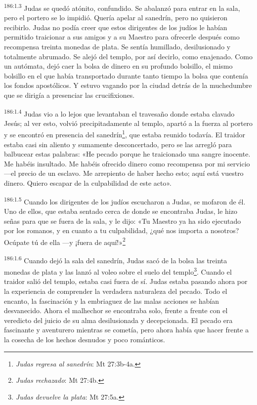 \par
\textsuperscript{186:1.3} Judas se quedó atónito, confundido. Se abalanzó para entrar en la sala, pero el portero se lo impidió. Quería apelar al sanedrín, pero no quisieron recibirlo. Judas no podía creer que estos dirigentes de los judíos le habían permitido traicionar a sus amigos y a su Maestro para ofrecerle después como recompensa treinta monedas de plata. Se sentía humillado, desilusionado y totalmente abrumado. Se alejó del templo, por así decirlo, como enajenado. Como un autómata, dejó caer la bolsa de dinero en su profundo bolsillo, el mismo bolsillo en el que había transportado durante tanto tiempo la bolsa que contenía los fondos apostólicos. Y estuvo vagando por la ciudad detrás de la muchedumbre que se dirigía a presenciar las crucifixiones.

\par
\textsuperscript{186:1.4} Judas vio a lo lejos que levantaban el travesaño donde estaba clavado Jesús; al ver esto, volvió precipitadamente al templo, apartó a la fuerza al portero y se encontró en presencia del sanedrín\footnote{\textit{Judas regresa al sanedrín}: Mt 27:3b-4a.}, que estaba reunido todavía. El traidor estaba casi sin aliento y sumamente desconcertado, pero se las arregló para balbucear estas palabras: «He pecado porque he traicionado una sangre inocente. Me habéis insultado. Me habéis ofrecido dinero como recompensa por mi servicio ---el precio de un esclavo. Me arrepiento de haber hecho esto; aquí está vuestro dinero. Quiero escapar de la culpabilidad de este acto».

\par
\textsuperscript{186:1.5} Cuando los dirigentes de los judíos escucharon a Judas, se mofaron de él. Uno de ellos, que estaba sentado cerca de donde se encontraba Judas, le hizo señas para que se fuera de la sala, y le dijo: «Tu Maestro ya ha sido ejecutado por los romanos, y en cuanto a tu culpabilidad, ¿qué nos importa a nosotros? Ocúpate tú de ella ---y ¡fuera de aquí!»\footnote{\textit{Judas rechazado}: Mt 27:4b.}

\par
\textsuperscript{186:1.6} Cuando dejó la sala del sanedrín, Judas sacó de la bolsa las treinta monedas de plata y las lanzó al voleo sobre el suelo del templo\footnote{\textit{Judas devuelve la plata}: Mt 27:5a.}. Cuando el traidor salió del templo, estaba casi fuera de sí. Judas estaba pasando ahora por la experiencia de comprender la verdadera naturaleza del pecado. Todo el encanto, la fascinación y la embriaguez de las malas acciones se habían desvanecido. Ahora el malhechor se encontraba solo, frente a frente con el veredicto del juicio de su alma desilusionada y decepcionada. El pecado era fascinante y aventurero mientras se cometía, pero ahora había que hacer frente a la cosecha de los hechos desnudos y poco románticos.

